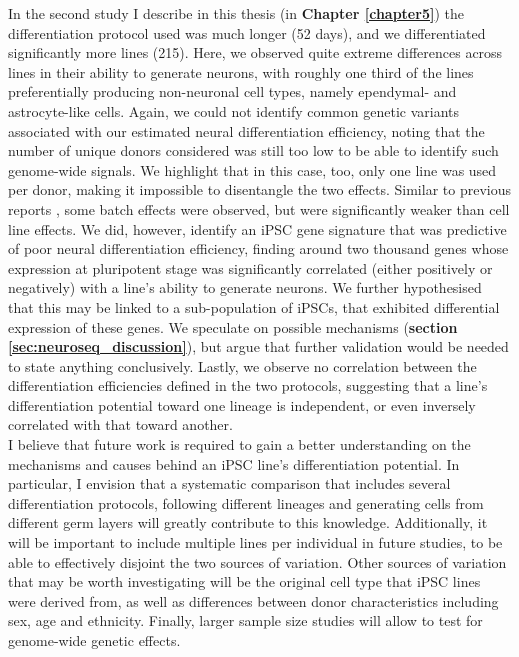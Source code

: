 In the second study I describe in this thesis (in \textbf{Chapter 
\ref{chapter5}}) the differentiation protocol used was much longer (52 days), and we differentiated significantly more lines (215).
Here, we observed quite extreme differences across lines in their ability to generate neurons, with roughly one third of the lines preferentially producing non-neuronal cell types, namely ependymal- and astrocyte-like cells.
Again, we could not identify common genetic variants associated with our estimated neural differentiation efficiency, noting that the number of unique donors considered was still too low to be able to identify such genome-wide signals.
We highlight that in this case, too, only one line was used per donor, making it impossible to disentangle the two effects.
Similar to previous reports \cite{schwartzentruber2018molecular}, some batch effects were observed, but were significantly weaker than cell line effects.
We did, however, identify an iPSC gene signature that was predictive of poor neural differentiation efficiency, finding around two thousand genes whose expression at pluripotent stage was significantly correlated (either positively or negatively) with a line's ability to generate neurons. 
We further hypothesised that this may be linked to a sub-population of iPSCs, that exhibited differential expression of these genes.
We speculate on possible mechanisms (\textbf{section
\ref{sec:neuroseq_discussion}}), but argue that further validation would be needed to state anything conclusively.
Lastly, we observe no correlation between the differentiation efficiencies defined in the two protocols, suggesting that a line's differentiation potential toward one lineage is independent, or even inversely correlated with that toward another. \\

I believe that future work is required to gain a better understanding on the mechanisms and causes behind an iPSC line's differentiation potential.
In particular, I envision that a systematic comparison that includes several differentiation protocols, following different lineages and generating cells from different germ layers will greatly contribute to this knowledge.
Additionally, it will be important to include multiple lines per individual in future studies, to be able to effectively disjoint the two sources of variation.
Other sources of variation that may be worth investigating will be the original cell type that iPSC lines were derived from, as well as differences between donor characteristics including sex, age and ethnicity.
Finally, larger sample size studies will allow to test for genome-wide genetic effects. \\


